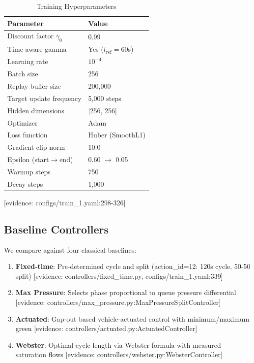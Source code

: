 \begin{table}[h]
\centering
\caption{Training Hyperparameters}
\begin{tabular}{ll}
\toprule
\textbf{Parameter} & \textbf{Value} \\
\midrule
Discount factor $\gamma_0$ & 0.99 \\
Time-aware gamma & Yes ($t_{\text{ref}}=60$s) \\
Learning rate & $10^{-4}$ \\
Batch size & 256 \\
Replay buffer size & 200,000 \\
Target update frequency & 5,000 steps \\
Hidden dimensions & [256, 256] \\
Optimizer & Adam \\
Loss function & Huber (SmoothL1) \\
Gradient clip norm & 10.0 \\
Epsilon (start$\to$end) & 0.60 $\to$ 0.05 \\
Warmup steps & 750 \\
Decay steps & 1,000 \\
\bottomrule
\end{tabular}
\end{table}
[evidence: configs/train\_1.yaml:298-326]

\subsection{Baseline Controllers}

We compare against four classical baselines:

\begin{enumerate}
    \item \textbf{Fixed-time}: Pre-determined cycle and split (action\_id=12: 120s cycle, 50-50 split)
    [evidence: controllers/fixed\_time.py, configs/train\_1.yaml:339]
    
    \item \textbf{Max Pressure}: Selects phase proportional to queue pressure differential
    [evidence: controllers/max\_pressure.py:MaxPressureSplitController]
    
    \item \textbf{Actuated}: Gap-out based vehicle-actuated control with minimum/maximum green
    [evidence: controllers/actuated.py:ActuatedController]
    
    \item \textbf{Webster}: Optimal cycle length via Webster formula with measured saturation flows
    [evidence: controllers/webster.py:WebsterController]
\end{enumerate}

